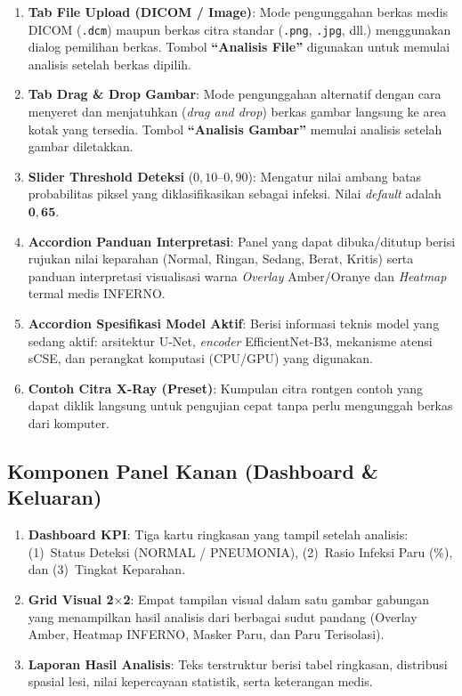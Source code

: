 \documentclass[12pt,a4paper]{article}
\begin{document}
\begin{enumerate}
    \item \textbf{Tab File Upload (DICOM / Image)}: Mode pengunggahan berkas
    medis DICOM (\texttt{.dcm}) maupun berkas citra standar (\texttt{.png},
    \texttt{.jpg}, dll.) menggunakan dialog pemilihan berkas. Tombol
    \textbf{``Analisis File''} digunakan untuk memulai analisis
    setelah berkas dipilih.

    \item \textbf{Tab Drag \& Drop Gambar}: Mode pengunggahan alternatif dengan
    cara menyeret dan menjatuhkan (\textit{drag and drop}) berkas gambar langsung
    ke area kotak yang tersedia. Tombol \textbf{``Analisis Gambar''}
    memulai analisis setelah gambar diletakkan.

    \item \textbf{Slider Threshold Deteksi} ($0{,}10$--$0{,}90$): Mengatur
    nilai ambang batas probabilitas piksel yang diklasifikasikan sebagai infeksi.
    Nilai \textit{default} adalah $\mathbf{0{,}65}$.

    \item \textbf{Accordion Panduan Interpretasi}: Panel yang dapat dibuka/ditutup
    berisi rujukan nilai keparahan (Normal, Ringan, Sedang, Berat, Kritis) serta
    panduan interpretasi visualisasi warna \textit{Overlay} Amber/Oranye dan
    \textit{Heatmap} termal medis INFERNO.

    \item \textbf{Accordion Spesifikasi Model Aktif}: Berisi informasi teknis
    model yang sedang aktif: arsitektur U-Net, \textit{encoder} EfficientNet-B3,
    mekanisme atensi sCSE, dan perangkat komputasi (CPU/GPU) yang digunakan.

    \item \textbf{Contoh Citra X-Ray (Preset)}: Kumpulan citra rontgen contoh
    yang dapat diklik langsung untuk pengujian cepat tanpa perlu mengunggah
    berkas dari komputer.
\end{enumerate}

\subsection{Komponen Panel Kanan (Dashboard \& Keluaran)}

\begin{enumerate}
    \item \textbf{Dashboard KPI}: Tiga kartu ringkasan yang tampil setelah
    analisis: (1)~Status Deteksi (NORMAL / PNEUMONIA), (2)~Rasio Infeksi Paru
    (\%), dan (3)~Tingkat Keparahan.

    \item \textbf{Grid Visual 2$\times$2}: Empat tampilan visual dalam satu
    gambar gabungan yang menampilkan hasil analisis dari berbagai sudut pandang (Overlay Amber, Heatmap INFERNO, Masker Paru, dan Paru Terisolasi).

    \item \textbf{Laporan Hasil Analisis}: Teks terstruktur berisi tabel
    ringkasan, distribusi spasial lesi, nilai kepercayaan statistik, serta
    keterangan medis.
\end{enumerate}
\end{document}
